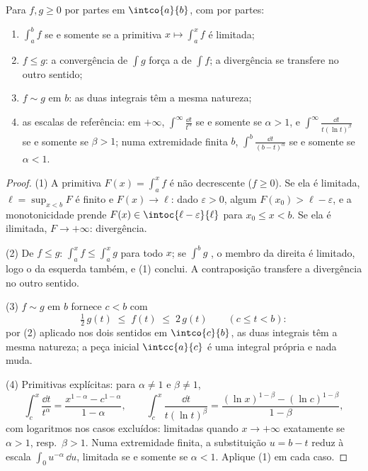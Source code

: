 \begin{theorem}\label{thm:b2:integration:comparison}
Para $f, g \geq 0$  por partes em $\intco{a}{b}$, com  por partes:
\begin{enumerate}
  \item $\int_a^b f$  se e somente se a primitiva $x \mapsto \int_a^x
        f$ é limitada;
  \item $f \leq g$: a convergência de $\int g$ força a de $\int f$;
        a divergência se transfere no outro sentido;
  \item $f \sim g$ em $b$: as duas integrais têm a mesma natureza;
  \item as escalas de referência: em $+\infty$, $\int^{\infty}
        \frac{\dd t}{t^\alpha}$  se e somente se $\alpha > 1$, e
        $\int^\infty \frac{\dd t}{t(\ln t)^\beta}$ se e somente se $\beta > 1$;
        numa extremidade finita $b$, $\int^b \frac{\dd t}{(b -
        t)^\alpha}$  se e somente se $\alpha < 1$.
\end{enumerate}
\end{theorem}

\begin{proof}
(1) A primitiva $F(x) = \int_a^x f$ é não decrescente ($f \geq
0$). Se ela é limitada, $\ell = \sup_{x < b}F$ é finito e
$F(x) \to \ell$: dado $\varepsilon > 0$, algum $F(x_0) > \ell -
\varepsilon$, e a monotonicidade prende $F(x) \in
\intoc{\ell - \varepsilon}{\ell}$ para $x_0 \leq x < b$. Se ela é
ilimitada, $F \to +\infty$: divergência.

(2) De $f \leq g$: $\int_a^x f \leq \int_a^x g$ para todo $x$;
se $\int^b g$ , o membro da direita é limitado, logo o da esquerda
também, e (1) conclui. A contraposição transfere a divergência
no outro sentido.

(3) $f \sim g$ em $b$ fornece $c < b$ com
\[
\tfrac12\,g(t) \;\leq\; f(t) \;\leq\; 2\,g(t)
\qquad (c \leq t < b) :
\]
por (2) aplicado nos dois sentidos em $\intco{c}{b}$, as duas integrais
têm a mesma natureza; a peça inicial $\intcc{a}{c}$ é uma
integral própria e nada muda.

(4) Primitivas explícitas: para $\alpha \neq 1$ e $\beta \neq 1$,
\[
\int_c^x \frac{\dd t}{t^\alpha}
= \frac{x^{1-\alpha} - c^{1-\alpha}}{1 - \alpha},
\qquad
\int_c^x \frac{\dd t}{t(\ln t)^\beta}
= \frac{(\ln x)^{1-\beta} - (\ln c)^{1-\beta}}{1 - \beta},
\]
com logaritmos nos casos excluídos: limitadas quando $x \to
+\infty$ exatamente se $\alpha > 1$, resp.\ $\beta > 1$. Numa
extremidade finita, a substituição $u = b - t$ reduz à
escala $\int_0 u^{-\alpha}\,\dd u$, limitada se e somente se $\alpha < 1$.
Aplique (1) em cada caso.
\end{proof}

